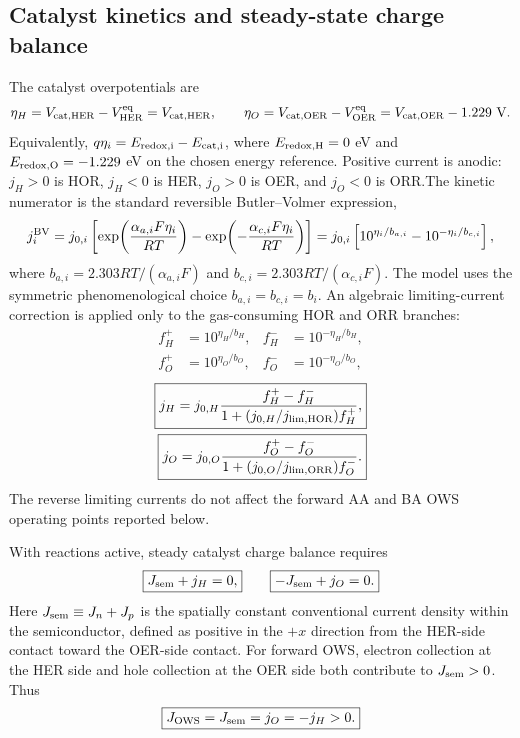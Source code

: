 \documentclass[11pt]{article}
\begin{document}
\subsection{Catalyst kinetics and steady-state charge balance}

The catalyst overpotentials are
\begin{equation}
\eta_H=V_{\rm cat,HER}-V_{\rm HER}^{\rm eq}=V_{\rm cat,HER},\qquad
\eta_O=V_{\rm cat,OER}-V_{\rm OER}^{\rm eq}=V_{\rm cat,OER}-1.229~\mathrm V.
\end{equation}
Equivalently, $q\eta_i=E_{\rm redox,i}-E_{\rm cat,i}$, where $E_{\rm redox,H}=0$ eV and $E_{\rm redox,O}=-1.229$ eV on the chosen energy reference. Positive current is anodic: $j_H>0$ is HOR, $j_H<0$ is HER, $j_O>0$ is OER, and $j_O<0$ is ORR.\@ The kinetic numerator is the standard reversible Butler--Volmer expression,\cite{bardfaulkner2001}
\begin{equation}
j_i^{\rm BV}=j_{0,i}\left[
\exp\!\left(\frac{\alpha_{a,i}F\eta_i}{RT}\right)
-\exp\!\left(-\frac{\alpha_{c,i}F\eta_i}{RT}\right)
\right]
=j_{0,i}\left[10^{\eta_i/b_{a,i}}-10^{-\eta_i/b_{c,i}}\right],
\label{eq:butler-volmer}
\end{equation}
where $b_{a,i}=2.303RT/(\alpha_{a,i}F)$ and $b_{c,i}=2.303RT/(\alpha_{c,i}F)$. The model uses the symmetric phenomenological choice $b_{a,i}=b_{c,i}=b_i$. An algebraic limiting-current correction is applied only to the gas-consuming HOR and ORR branches:
\begin{align}
f_H^+&=10^{\eta_H/b_H}, & f_H^-&=10^{-\eta_H/b_H},\\
f_O^+&=10^{\eta_O/b_O}, & f_O^-&=10^{-\eta_O/b_O},
\end{align}
\begin{align}
\boxed{j_H=j_{0,H}\frac{f_H^+-f_H^-}{1+(j_{0,H}/j_{\rm lim,HOR})f_H^+},}\\
\boxed{j_O=j_{0,O}\frac{f_O^+-f_O^-}{1+(j_{0,O}/j_{\rm lim,ORR})f_O^-}.}
\label{eq:faradaic}
\end{align}
The reverse limiting currents do not affect the forward AA and BA OWS operating points reported below.

With reactions active, steady catalyst charge balance requires
\begin{equation}
\boxed{J_{\rm sem}+j_H=0,}\qquad
\boxed{-J_{\rm sem}+j_O=0.}
\label{eq:catalyst-balance}
\end{equation}
Here $J_{\rm sem}\equiv J_n+J_p$ is the spatially constant conventional current density within the semiconductor, defined as positive in the $+x$ direction from the HER-side contact toward the OER-side contact. For forward OWS, electron collection at the HER side and hole collection at the OER side both contribute to $J_{\rm sem}>0$. Thus
\begin{equation}
\boxed{J_{\rm OWS}=J_{\rm sem}=j_O=-j_H>0.}
\label{eq:owsbalance}
\end{equation}
\end{document}
